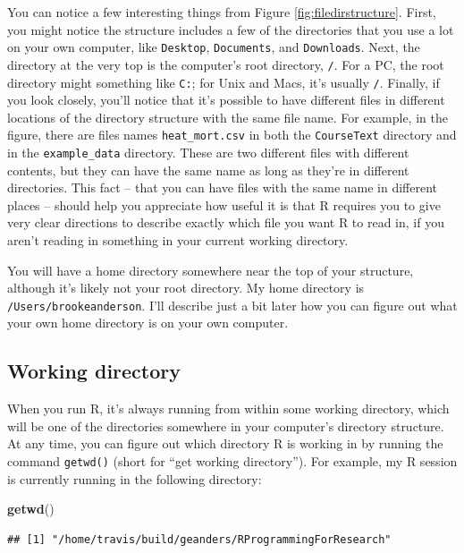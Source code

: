 \documentclass[]{book}
\makeatletter
\newenvironment{Shaded}{\begin{snugshade}}{\end{snugshade}}
\newcommand{\KeywordTok}[1]{\textcolor[rgb]{0.13,0.29,0.53}{\textbf{{#1}}}}
\newcommand{\NormalTok}[1]{{#1}}
\newenvironment{kframe}{%
\medskip{}
\setlength{\fboxsep}{.8em}
 \def\at@end@of@kframe{}%
 \ifinner\ifhmode%
  \def\at@end@of@kframe{\end{minipage}}%
  \begin{minipage}{\columnwidth}%
 \fi\fi%
 \def\FrameCommand##1{\hskip\@totalleftmargin \hskip-\fboxsep
 \colorbox{shadecolor}{##1}\hskip-\fboxsep
     \hskip-\linewidth \hskip-\@totalleftmargin \hskip\columnwidth}%
 \MakeFramed {\advance\hsize-\width
   \@totalleftmargin\z@ \linewidth\hsize
   \@setminipage}}%
 {\par\unskip\endMakeFramed%
 \at@end@of@kframe}
\renewenvironment{Shaded}{\begin{kframe}}{\end{kframe}}
\makeatother
\begin{document}
You can notice a few interesting things from Figure
\ref{fig:filedirstructure}. First, you might notice the structure
includes a few of the directories that you use a lot on your own
computer, like \texttt{Desktop}, \texttt{Documents}, and
\texttt{Downloads}. Next, the directory at the very top is the
computer's root directory, \texttt{/}. For a PC, the root directory
might something like \texttt{C:}; for Unix and Macs, it's usually
\texttt{/}. Finally, if you look closely, you'll notice that it's
possible to have different files in different locations of the directory
structure with the same file name. For example, in the figure, there are
files names \texttt{heat\_mort.csv} in both the \texttt{CourseText}
directory and in the \texttt{example\_data} directory. These are two
different files with different contents, but they can have the same name
as long as they're in different directories. This fact -- that you can
have files with the same name in different places -- should help you
appreciate how useful it is that R requires you to give very clear
directions to describe exactly which file you want R to read in, if you
aren't reading in something in your current working directory.

You will have a home directory somewhere near the top of your structure,
although it's likely not your root directory. My home directory is
\texttt{/Users/brookeanderson}. I'll describe just a bit later how you
can figure out what your own home directory is on your own computer.

\subsection{Working directory}\label{working-directory}

When you run R, it's always running from within some working directory,
which will be one of the directories somewhere in your computer's
directory structure. At any time, you can figure out which directory R
is working in by running the command \texttt{getwd()} (short for ``get
working directory''). For example, my R session is currently running in
the following directory:

\begin{Shaded}
\begin{Highlighting}[]
\KeywordTok{getwd}\NormalTok{()}
\end{Highlighting}
\end{Shaded}

\begin{verbatim}
## [1] "/home/travis/build/geanders/RProgrammingForResearch"
\end{verbatim}
\end{document}

